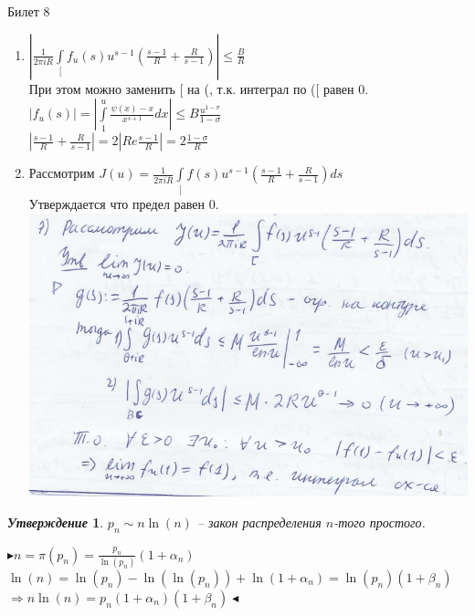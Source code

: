 \documentclass[a4paper,12pt]{article}
\newtheorem{utv}{\textit{Утверждение}}
\newcommand{\SI}{\psi}
\newcommand{\q}{\quad}
\newcommand{\pb}{\blacktriangleright}
\newcommand{\pe}{\blacktriangleleft}
\newcommand{\Ra}{\Rightarrow}
\newcommand{\IL}{\int\limits}
\newcommand{\os}{\left(}
\newcommand{\cs}{\right)}
\begin{document}
\begin{mybox}{\hypertarget{bil8}{Билет 8}}
\begin{enumerate}
$\Ra \left| \frac{s-1}{R} + \frac{R}{s-1}  \right| = 2 |Re\frac{s-1}{R}| = 2 \frac{\sigma - 1}{R} \pe$
\item $\left| \frac{1}{2\pi i R}\IL_[ f_u(s)u^{s-1} \os   \frac{s-1}{R} + \frac{R}{s-1} \cs   \right| \le \frac{B}{R}$\\
При этом можно заменить [ на (, т.к. интеграл по ([ равен 0.\\
$|f_u(s)| = |\IL_1^u \frac{\SI(x)-x}{x^{s+1}}dx|\le B \frac{u^{1-\sigma}}{1-\sigma}$\\
$|  \frac{s-1}{R} + \frac{R}{s-1} | = 2 |Re \frac{s-1}{R}| = 2 \frac{1 - \sigma}{R}$
\item Рассмотрим $J(u) = \frac{1}{2\pi i R} \IL_[ f(s)u^{s-1} \os   \frac{s-1}{R} + \frac{R}{s-1} \cs ds$\\
Утверждается что предел равен 0.\\
\includegraphics{p2.png}\q\\
\end{enumerate}
\begin{utv} $p_n \sim n\ln(n)$ -- закон распределения $n$-того простого.
\end{utv}
$\pb n = \pi(p_n) = \frac{p_n}{\ln(p_n)}(1+\alpha_n) $\\
$\ln(n)  = \ln(p_n) - \ln(\ln(p_n)) + \ln(1+\alpha_n) = \ln(p_n)(1 + \beta_n)  $\\
$\Ra n\ln(n) = p_n(1 + \alpha_n)(1 + \beta_n) \pe $
\end{mybox}
\end{document}
